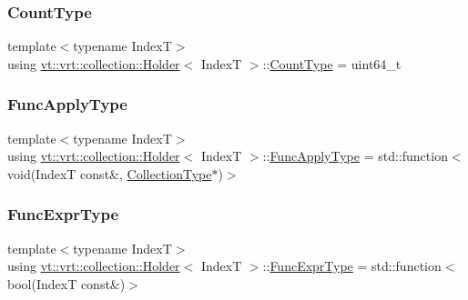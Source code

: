 \mbox{\label{structvt_1_1vrt_1_1collection_1_1_holder_afdfca52a996f6ac65e6f9e59035f2e3a}} 
\subsubsection{\texorpdfstring{Count\+Type}{CountType}}
{\footnotesize\ttfamily template$<$typename IndexT$>$ \\
using \hyperlink{structvt_1_1vrt_1_1collection_1_1_holder}{vt\+::vrt\+::collection\+::\+Holder}$<$ IndexT $>$\+::\hyperlink{structvt_1_1vrt_1_1collection_1_1_holder_afdfca52a996f6ac65e6f9e59035f2e3a}{Count\+Type} =  uint64\+\_\+t}

\mbox{\label{structvt_1_1vrt_1_1collection_1_1_holder_ad90339cb0c4fe0d69f4e0100265a15d4}} 
\subsubsection{\texorpdfstring{Func\+Apply\+Type}{FuncApplyType}}
{\footnotesize\ttfamily template$<$typename IndexT$>$ \\
using \hyperlink{structvt_1_1vrt_1_1collection_1_1_holder}{vt\+::vrt\+::collection\+::\+Holder}$<$ IndexT $>$\+::\hyperlink{structvt_1_1vrt_1_1collection_1_1_holder_ad90339cb0c4fe0d69f4e0100265a15d4}{Func\+Apply\+Type} =  std\+::function$<$void(IndexT const\&, \hyperlink{structvt_1_1vrt_1_1collection_1_1_holder_ad940337a70ac576f960ea2d22a33f290}{Collection\+Type}$\ast$)$>$}

\mbox{\label{structvt_1_1vrt_1_1collection_1_1_holder_a4d4364a2f3aa30c8a86cb08742a84e25}} 
\subsubsection{\texorpdfstring{Func\+Expr\+Type}{FuncExprType}}
{\footnotesize\ttfamily template$<$typename IndexT$>$ \\
using \hyperlink{structvt_1_1vrt_1_1collection_1_1_holder}{vt\+::vrt\+::collection\+::\+Holder}$<$ IndexT $>$\+::\hyperlink{structvt_1_1vrt_1_1collection_1_1_holder_a4d4364a2f3aa30c8a86cb08742a84e25}{Func\+Expr\+Type} =  std\+::function$<$bool(IndexT const\&)$>$}

